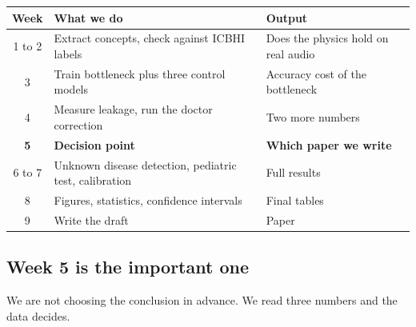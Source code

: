 \documentclass[11pt,a4paper]{article}
\begin{document}
\begin{center}
\begin{tabular}{@{}cll@{}}
\toprule
\textbf{Week} & \textbf{What we do} & \textbf{Output} \\
\midrule
1 to 2 & Extract concepts, check against ICBHI labels & Does the physics hold on real audio \\
3      & Train bottleneck plus three control models   & Accuracy cost of the bottleneck \\
4      & Measure leakage, run the doctor correction   & Two more numbers \\
\textbf{5} & \textbf{Decision point} & \textbf{Which paper we write} \\
6 to 7 & Unknown disease detection, pediatric test, calibration & Full results \\
8      & Figures, statistics, confidence intervals    & Final tables \\
9      & Write the draft                              & Paper \\
\bottomrule
\end{tabular}
\end{center}

\subsection*{Week 5 is the important one}

We are not choosing the conclusion in advance. We read three numbers and the data
decides.

\vspace{4pt}
\begin{center}
\end{center}
\end{document}
